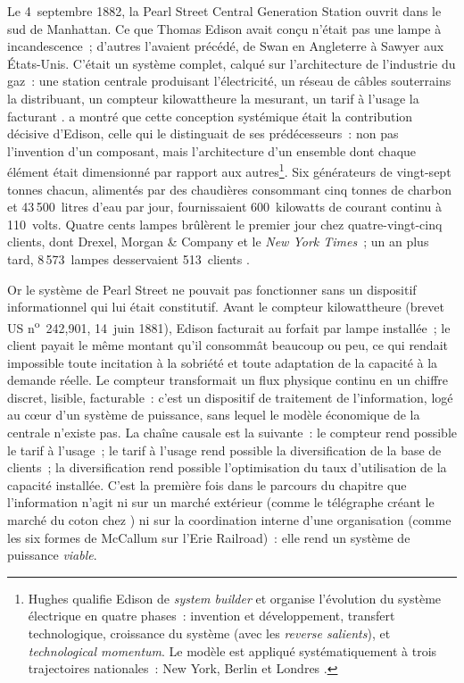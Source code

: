 %
Le 4~septembre 1882, la Pearl Street Central Generation Station ouvrit dans le sud de Manhattan. Ce que Thomas Edison avait conçu n'était pas une lampe à incandescence~; d'autres l'avaient précédé, de Swan en Angleterre à Sawyer aux États-Unis. C'était un système complet, calqué sur l'architecture de l'industrie du gaz~: une station centrale produisant l'électricité, un réseau de câbles souterrains la distribuant, un compteur kilowattheure la mesurant, un tarif à l'usage la facturant \parencite{kooij_electric_light_2015}. \textcite{hughes_networks_1983} a montré que cette conception systémique était la contribution décisive d'Edison, celle qui le distinguait de ses prédécesseurs~: non pas l'invention d'un composant, mais l'architecture d'un ensemble dont chaque élément était dimensionné par rapport aux autres\footnote{Hughes qualifie Edison de \emph{system builder} et organise l'évolution du système électrique en quatre phases~: invention et développement, transfert technologique, croissance du système (avec les \emph{reverse salients}), et \emph{technological momentum}. Le modèle est appliqué systématiquement à trois trajectoires nationales~: New York, Berlin et Londres \parencite{hughes_networks_1983}.}. Six générateurs de vingt-sept tonnes chacun, alimentés par des chaudières consommant cinq tonnes de charbon et 43\,500~litres d'eau par jour, fournissaient 600~kilowatts de courant continu à 110~volts. Quatre cents lampes brûlèrent le premier jour chez quatre-vingt-cinq clients, dont Drexel, Morgan \& Company et le \emph{New York Times}~; un an plus tard, 8\,573~lampes desservaient 513~clients \parencite{kooij_electric_light_2015}.

%
Or le système de Pearl Street ne pouvait pas fonctionner sans un dispositif informationnel qui lui était constitutif. Avant le compteur kilowattheure (brevet US n\textsuperscript{o}~242,901, 14~juin 1881), Edison facturait au forfait par lampe installée~; le client payait le même montant qu'il consommât beaucoup ou peu, ce qui rendait impossible toute incitation à la sobriété et toute adaptation de la capacité à la demande réelle. Le compteur transformait un flux physique continu en un chiffre discret, lisible, facturable~: c'est un dispositif de traitement de l'information, logé au c\oe{}ur d'un système de puissance, sans lequel le modèle économique de la centrale n'existe pas. La chaîne causale est la suivante~: le compteur rend possible le tarif à l'usage~; le tarif à l'usage rend possible la diversification de la base de clients~; la diversification rend possible l'optimisation du taux d'utilisation de la capacité installée. C'est la première fois dans le parcours du chapitre que l'information n'agit ni sur un marché extérieur (comme le télégraphe créant le marché du coton chez \textcite{steinwender_real_2018}) ni sur la coordination interne d'une organisation (comme les six formes de McCallum sur l'Erie Railroad)~: elle rend un système de puissance \emph{viable}.

